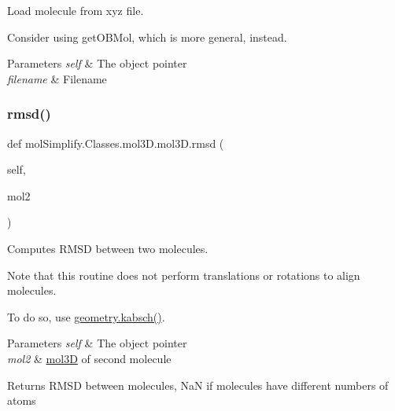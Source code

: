 Load molecule from xyz file. 

Consider using get\+O\+B\+Mol, which is more general, instead. 
\begin{DoxyParams}{Parameters}
{\em self} & The object pointer \\
\hline
{\em filename} & Filename \\
\hline
\end{DoxyParams}
\mbox{\label{classmolSimplify_1_1Classes_1_1mol3D_1_1mol3D_a970c3cdf7b4a051715a89e284d4227e6}} 
\subsubsection{\texorpdfstring{rmsd()}{rmsd()}}
{\footnotesize\ttfamily def mol\+Simplify.\+Classes.\+mol3\+D.\+mol3\+D.\+rmsd (\begin{DoxyParamCaption}\item[{}]{self,  }\item[{}]{mol2 }\end{DoxyParamCaption})}



Computes R\+M\+SD between two molecules. 

Note that this routine does not perform translations or rotations to align molecules.

To do so, use \hyperlink{namespacemolSimplify_1_1Scripts_1_1geometry_ab71755d5aac3ee68201fb79536be659d}{geometry.\+kabsch()}. 
\begin{DoxyParams}{Parameters}
{\em self} & The object pointer \\
\hline
{\em mol2} & \hyperlink{classmolSimplify_1_1Classes_1_1mol3D_1_1mol3D}{mol3D} of second molecule \\
\hline
\end{DoxyParams}
\begin{DoxyReturn}{Returns}
R\+M\+SD between molecules, NaN if molecules have different numbers of atoms 
\end{DoxyReturn}
\mbox{\label{classmolSimplify_1_1Classes_1_1mol3D_1_1mol3D_af79c7b686fca67c122bb1e0507f845a6}} 
